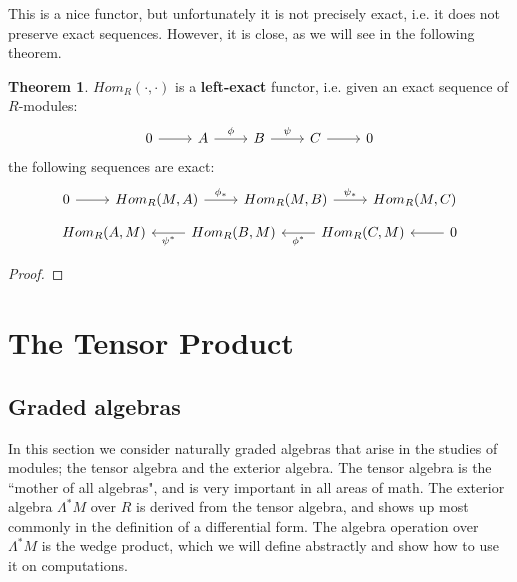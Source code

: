 \documentclass[11pt, oneside]{amsart}   	%
\theoremstyle{definition}
\newtheorem{theorem}{Theorem}[section]
\begin{document}
This is a nice functor, but unfortunately it is not precisely exact, i.e. it does not preserve exact sequences. However, it is close, as we will 
see in the following theorem.
\begin{theorem}
	$Hom_R(\cdot, \cdot)$ is a \textbf{left-exact} functor, i.e. given an exact sequence of $R$-modules:
	\begin{equation}\begin{tikzcd}
		0\arrow[r] & A\arrow[r, "\phi"] & B\arrow[r, "\psi"] & C\arrow[r] & 0
	\end{tikzcd}\end{equation}
	the following sequences are exact:
	\begin{equation}\begin{tikzcd}
		0\arrow[r] & Hom_R(M, A)\arrow[r, "\phi_*"] & Hom_R(M, B)\arrow[r, "\psi_*"] & Hom_R(M, C)
	\end{tikzcd}\end{equation}
	\begin{equation}\begin{tikzcd}
		Hom_R(A, M) & Hom_R(B, M)\arrow[l, "\psi^*"] & Hom_R(C, M)\arrow[l, "\phi^*"] & 0\arrow[l]
	\end{tikzcd}\end{equation}	
\end{theorem}

\begin{proof}

\end{proof}

\section{The Tensor Product}

\subsection{Graded algebras}

In this section we consider naturally graded algebras that arise in the studies of modules; the tensor algebra and the 
exterior algebra. The tensor algebra is the ``mother of all algebras", and is very important in all areas of math. The exterior 
algebra $\Lambda^*M$ over $R$ is derived from the tensor algebra, and shows up most commonly in the 
definition of a differential form. The algebra operation over $\Lambda^*M$ is the wedge product, which we will define abstractly 
and show how to use it on computations. 
\end{document}

